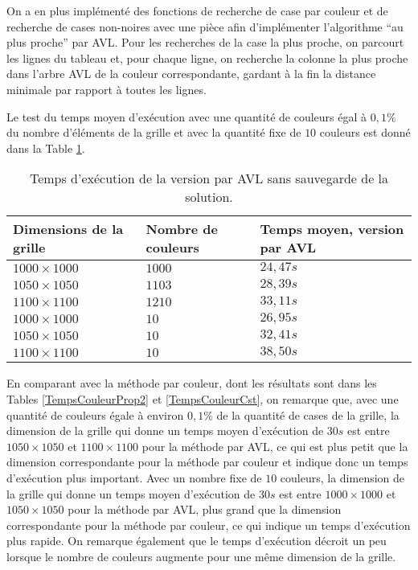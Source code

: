 \documentclass[a4paper,12pt]{article}
\numberwithin{equation}{section}
\begin{document}
On a en plus implémenté des fonctions de recherche de case par couleur et de recherche de cases non-noires avec une pièce afin d'implémenter l'algorithme ``au plus proche'' par AVL. Pour les recherches de la case la plus proche, on parcourt les lignes du tableau \verb@M@ et, pour chaque ligne, on recherche la colonne la plus proche dans l'arbre AVL de la couleur correspondante, gardant à la fin la distance minimale par rapport à toutes les lignes.

Le test du temps moyen d'exécution avec une quantité de couleurs égal à $0,1\%$ du nombre d'éléments de la grille et avec la quantité fixe de $10$ couleurs est donné dans la Table \ref{TempsAVL}.

\begin{table}
\centering
\begin{tabular}{>{\centering} m{} >{\centering} m{} >{\centering} m{}}
\hline\hline
Dimensions de la grille & Nombre de couleurs & Temps moyen, version par AVL \tabularnewline
\hline
$1000 \times 1000$ & $1000$ & $24,47 s$ \tabularnewline
$1050 \times 1050$ & $1103$ & $28,39 s$ \tabularnewline
$1100 \times 1100$ & $1210$ & $33,11 s$ \tabularnewline
\hline
$1000 \times 1000$ & $10$ & $26,95 s$ \tabularnewline
$1050 \times 1050$ & $10$ & $32,41 s$ \tabularnewline
$1100 \times 1100$ & $10$ & $38,50 s$ \tabularnewline
\hline\hline
\end{tabular}
\caption{Temps d'exécution de la version par AVL sans sauvegarde de la solution.}
\label{TempsAVL}
\end{table}

En comparant avec la méthode par couleur, dont les résultats sont dans les Tables \ref{TempsCouleurProp2} et \ref{TempsCouleurCst}, on remarque que, avec une quantité de couleurs égale à environ $0,1\%$ de la quantité de cases de la grille, la dimension de la grille qui donne un temps moyen d'exécution de $30 s$ est entre $1050 \times 1050$ et $1100 \times 1100$ pour la méthode par AVL, ce qui est plus petit que la dimension correspondante pour la méthode par couleur et indique donc un temps d'exécution plus important. Avec un nombre fixe de $10$ couleurs, la dimension de la grille qui donne un temps moyen d'exécution de $30 s$ est entre $1000 \times 1000$ et $1050 \times 1050$ pour la méthode par AVL, plus grand que la dimension correspondante pour la méthode par couleur, ce qui indique un temps d'exécution plus rapide. On remarque également que le temps d'exécution décroit un peu lorsque le nombre de couleurs augmente pour une même dimension de la grille.
\end{document}
